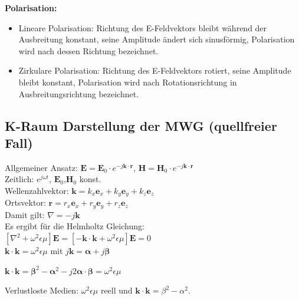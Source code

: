 \documentclass[english]{latex4ei/latex4ei_sheet}
\begin{document}
\begin{sectionbox}
\textbf{Polarisation:}
\begin{itemize}
	\item Lineare Polarisation: Richtung des E-Feldvektors bleibt während der Ausbreitung konstant, seine Amplitude ändert sich sinusförmig, Polarisation wird nach dessen Richtung bezeichnet.
	\item Zirkulare Polarisation: Richtung des E-Feldvektors rotiert, seine Amplitude bleibt konstant, Polarisation wird nach Rotationsrichtung in Ausbreitungsrichtung bezeichnet.
\end{itemize}
	
\end{sectionbox}
\begin{sectionbox}
	\subsection{K-Raum Darstellung der MWG (quellfreier Fall)}
	Allgemeiner Ansatz: $\mathbf{E} = \mathbf{E}_0 \cdot e^{-j \mathbf{k}\cdot\mathbf{r}}$, $\mathbf{H} = \mathbf{H}_0 \cdot e^{-j \mathbf{k}\cdot\mathbf{r}}$\\
	Zeitlich: $e^{j\omega t}$, \quad $\mathbf{E}_0$,$\mathbf{H}_0$ konst.\\
	Wellenzahlvektor: $\mathbf{k} = k_x\mathbf{e}_x + k_y\mathbf{e}_y + k_z\mathbf{e}_z$\\
	Ortsvektor: $\mathbf{r} = r_x\mathbf{e}_x + r_y\mathbf{e}_y + r_z\mathbf{e}_z$\\
	Damit gilt: $\nabla = -j\mathbf{k} $\\
	
	Es ergibt für die Helmholtz Gleichung:\\
	$[\nabla^2 + \omega^2\epsilon\mu]\mathbf{E} = [-\mathbf{k}\cdot\mathbf{k} + \omega^2\epsilon\mu]\mathbf{E} = 0$\\
	$\mathbf{k}\cdot\mathbf{k} = \omega^2\epsilon\mu$ mit $j\mathbf{k} = \mathbf{\alpha} + j\mathbf{\beta}$\\
	
	\begin{emphbox}
		$\mathbf{k}\cdot\mathbf{k} = \mathbf{\beta}^2 - \mathbf{\alpha}^2 -j2\mathbf{\alpha}\cdot\mathbf{\beta} = \omega^2\epsilon\mu$
	\end{emphbox}
Verlustloste Medien: $\omega^2\epsilon\mu$ reell und $\mathbf{k}\cdot\mathbf{k} = \beta^2 - \alpha^2$.
\end{sectionbox}
\end{document}
